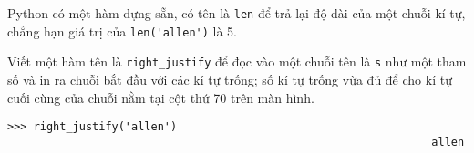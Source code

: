 \documentclass[11pt]{book}
\begin{document}
\begin{ex}


Python có một hàm dựng sẵn, có tên là {\tt len} để trả lại độ dài của một
chuỗi kí tự, chẳng hạn giá trị của  \verb"len('allen')" là 5.

Viết một hàm tên là \verb"right_justify" để đọc vào một chuỗi tên là
{\tt s} như một tham số và in ra chuỗi bắt đầu với các kí tự trống; số kí tự
trống vừa đủ để cho kí tự cuối cùng của chuỗi nằm tại cột thứ 70 trên màn
hình.

\beforeverb
\begin{verbatim}
>>> right_justify('allen')
                                                                 allen
\end{verbatim}
\afterverb

\end{ex}
\end{document}
